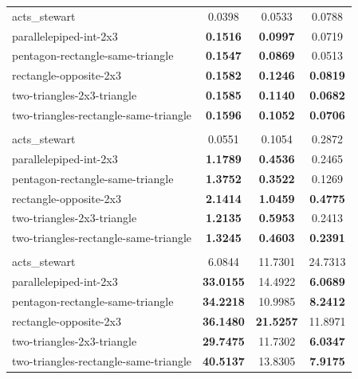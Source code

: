 {\begin{longtable}{>{\raggedright\arraybackslash}p{} c c c}
\multicolumn{4}{l}{\textbf{Conditioning Index} $\nu$} \\
\midrule
acts\_stewart & 0.0398 & 0.0533 & 0.0788 \\
parallelepiped-int-2x3 & \textbf{0.1516} & \textbf{0.0997} & 0.0719 \\
pentagon-rectangle-same-triangle & \textbf{0.1547} & \textbf{0.0869} & 0.0513 \\
rectangle-opposite-2x3 & \textbf{0.1582} & \textbf{0.1246} & \textbf{0.0819} \\
two-triangles-2x3-triangle & \textbf{0.1585} & \textbf{0.1140} & \textbf{0.0682} \\
two-triangles-rectangle-same-triangle & \textbf{0.1596} & \textbf{0.1052} & \textbf{0.0706} \\
\midrule[\lightrulewidth]

\multicolumn{4}{l}{\textbf{Manipulability}} \\
\midrule
acts\_stewart & 0.0551 & 0.1054 & 0.2872 \\
parallelepiped-int-2x3 & \textbf{1.1789} & \textbf{0.4536} & 0.2465 \\
pentagon-rectangle-same-triangle & \textbf{1.3752} & \textbf{0.3522} & 0.1269 \\
rectangle-opposite-2x3 & \textbf{2.1414} & \textbf{1.0459} & \textbf{0.4775} \\
two-triangles-2x3-triangle & \textbf{1.2135} & \textbf{0.5953} & 0.2413 \\
two-triangles-rectangle-same-triangle & \textbf{1.3245} & \textbf{0.4603} & \textbf{0.2391} \\
\midrule[\lightrulewidth]

\multicolumn{4}{l}{\textbf{Radius Available Force}} \\
\midrule
acts\_stewart & 6.0844 & 11.7301 & 24.7313 \\
parallelepiped-int-2x3 & \textbf{33.0155} & 14.4922 & \textbf{6.0689} \\
pentagon-rectangle-same-triangle & \textbf{34.2218} & 10.9985 & \textbf{8.2412} \\
rectangle-opposite-2x3 & \textbf{36.1480} & \textbf{21.5257} & 11.8971 \\
two-triangles-2x3-triangle & \textbf{29.7475} & 11.7302 & \textbf{6.0347} \\
two-triangles-rectangle-same-triangle & \textbf{40.5137} & 13.8305 & \textbf{7.9175} \\
\midrule[\lightrulewidth]


\end{longtable}}

